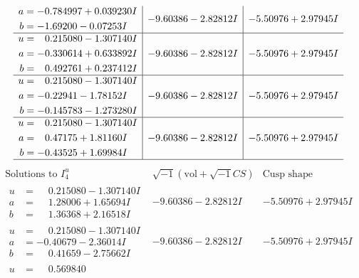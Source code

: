 \documentclass[1p]{elsarticle_modified}
\theoremstyle{definition}
\newcommand{\I}{\sqrt{-1}}
\begin{document}
$$\begin{array}{c|c|c}
\begin{aligned}
a &= -0.784997 + 0.039230 I \\
b &= -1.69200 - 0.07253 I\end{aligned}
 & -9.60386 - 2.82812 I & -5.50976 + 2.97945 I \\ \hline\begin{aligned}
u &= \phantom{-}0.215080 - 1.307140 I \\
a &= -0.330614 + 0.633892 I \\
b &= \phantom{-}0.492761 + 0.237412 I\end{aligned}
 & -9.60386 - 2.82812 I & -5.50976 + 2.97945 I \\ \hline\begin{aligned}
u &= \phantom{-}0.215080 - 1.307140 I \\
a &= -0.22941 - 1.78152 I \\
b &= -0.145783 - 1.273280 I\end{aligned}
 & -9.60386 - 2.82812 I & -5.50976 + 2.97945 I \\ \hline\begin{aligned}
u &= \phantom{-}0.215080 - 1.307140 I \\
a &= \phantom{-}0.47175 + 1.81160 I \\
b &= -0.43525 + 1.69984 I\end{aligned}
 & -9.60386 - 2.82812 I & -5.50976 + 2.97945 I\\
 \hline 
 \end{array}$$\newpage$$\begin{array}{c|c|c}  
\text{Solutions to }I^u_{4}& \I (\text{vol} + \sqrt{-1}CS) & \text{Cusp shape}\\
 \hline 
\begin{aligned}
u &= \phantom{-}0.215080 - 1.307140 I \\
a &= \phantom{-}1.28006 + 1.65694 I \\
b &= \phantom{-}1.36368 + 2.16518 I\end{aligned}
 & -9.60386 - 2.82812 I & -5.50976 + 2.97945 I \\ \hline\begin{aligned}
u &= \phantom{-}0.215080 - 1.307140 I \\
a &= -0.40679 - 2.36014 I \\
b &= \phantom{-}0.41659 - 2.75662 I\end{aligned}
 & -9.60386 - 2.82812 I & -5.50976 + 2.97945 I \\ \hline\begin{aligned}
u &= \phantom{-}0.569840\phantom{ +0.000000I} \\

\end{aligned}
\end{array}$$
\end{document}
